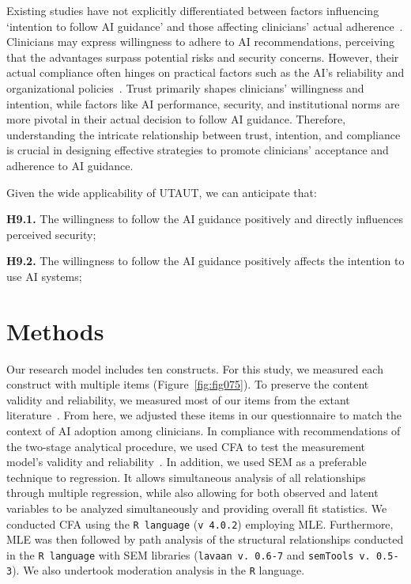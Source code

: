 \textcolor{revised}{Existing studies have not explicitly differentiated between factors influencing `intention to follow \ac{AI} guidance' and those affecting clinicians’ actual adherence~\cite{AMEEN2021106548}.
Clinicians may express willingness to adhere to \ac{AI} recommendations, perceiving that the advantages surpass potential risks and security concerns.
However, their actual compliance often hinges on practical factors such as the \ac{AI}'s reliability and organizational policies~\cite{JURAVLE2020263}.
Trust primarily shapes clinicians' willingness and intention, while factors like \ac{AI} performance, security, and institutional norms are more pivotal in their actual decision to follow \ac{AI} guidance.
Therefore, understanding the intricate relationship between trust, intention, and compliance is crucial in designing effective strategies to promote clinicians' acceptance and adherence to \ac{AI} guidance.}

\vspace{2.00mm}

\noindent
Given the wide applicability of \ac{UTAUT}, we can anticipate that:

\vspace{2.00mm}

\noindent
{\bf H9.1.} The willingness to follow the \ac{AI} guidance positively and directly influences perceived security;

\vspace{2.00mm}

\noindent
{\bf H9.2.} The willingness to follow the \ac{AI} guidance positively affects the intention to use AI systems;


\section{Methods}
\label{sec:chap004004}

Our research model includes ten constructs.
For this study, we measured each construct with multiple items (Figure~\ref{fig:fig075}).
To preserve the content validity and reliability, we measured most of our items from the extant literature~\cite{SOHN2020101324}.
From here, we adjusted these items in our questionnaire to match the context of \ac{AI} adoption among clinicians.
In compliance with recommendations of the two-stage analytical procedure, we used \ac{CFA} to test the measurement model’s validity and reliability~\cite{2019-07124-034}.
In addition, we used \ac{SEM} as a preferable technique to regression.
It allows simultaneous analysis of all relationships through multiple regression, while also allowing for both observed and latent variables to be analyzed simultaneously and providing overall fit statistics.
We conducted \ac{CFA} using the \texttt{R language} (\texttt{v 4.0.2}) employing \ac{MLE}.
Furthermore, \ac{MLE} was then followed by path analysis of the structural relationships conducted in the \texttt{R language} with \ac{SEM} libraries (\texttt{lavaan v. 0.6-7} and \texttt{semTools v. 0.5-3}).
We also undertook moderation analysis in the \texttt{R} language.

